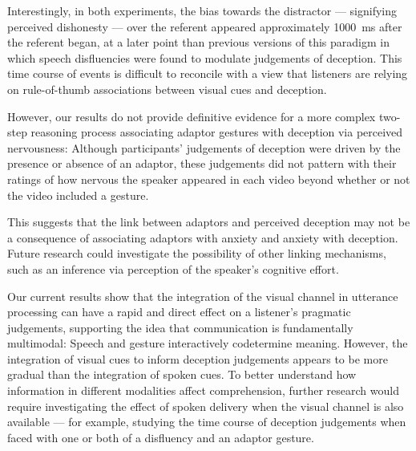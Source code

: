 \documentclass[a4paper,man,natbib]{apa6}
\begin{document}
Interestingly, in both experiments, the bias towards the distractor --- signifying perceived dishonesty --- over the referent appeared approximately 1000~ms after the referent began, at a later point than previous versions of this paradigm in which speech disfluencies were found to modulate judgements of deception. 
This time course of events is difficult to reconcile with a view that listeners are relying on rule-of-thumb associations between visual cues and deception.

However, our results do not provide definitive evidence for a more complex two-step reasoning process associating adaptor gestures with deception via perceived nervousness: Although participants' judgements of deception were driven by the presence or absence of an adaptor, these judgements did not pattern with their ratings of how nervous the speaker appeared in each video beyond whether or not the video included a gesture.

This suggests that the link between adaptors and perceived deception may not be a consequence of associating adaptors with anxiety and anxiety with deception.
Future research could investigate the possibility of other linking mechanisms, such as an inference via perception of the speaker's cognitive effort.

Our current results show that the integration of the visual channel in utterance processing can have a rapid and direct effect on a listener's pragmatic judgements, supporting the idea that communication is fundamentally multimodal: 
Speech and gesture interactively codetermine meaning.
However, the integration of visual cues to inform deception judgements appears to be more gradual than the integration of spoken cues.
To better understand how information in different modalities affect comprehension, further research would require investigating the effect of spoken delivery when the visual channel is also available --- for example, studying the time course of deception judgements when faced with one or both of a disfluency and an adaptor gesture.


\end{document}
